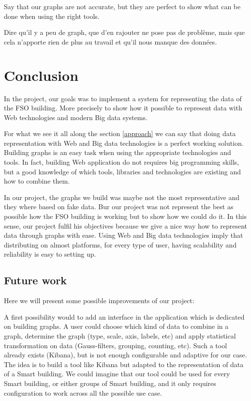 \documentclass{acm_proc_article-sp}
\begin{document}
Say that our graphs are not accurate, but they are perfect to show what can be done when using the right tools.

Dire qu'il y a peu de graph, que d'en rajouter ne pose pas de problème, mais que cela n'apporte rien de plus au travail et qu'il nous manque des données.
\section{Conclusion}
\label{conclusion}
In the project, our goals was to implement a system for representing the data of the FSO building. More precisely to show how it possible to represent data with Web technologies and modern Big data systems.

For what we see it all along the section \ref{approach} we can say that doing data representation with Web and Big data technologies is a perfect working solution. Building graphs is an easy task when using the appropriate technologies and tools. In fact, building Web application do not requires big programming skills, but a good knowledge of which tools, libraries and technologies are existing and how to combine them.

In our project, the graphs we build was maybe not the most representative and they where based on fake data. Bur our project was not represent the best as possible how the FSO building is working but to show how we could do it. In this sense, our project fulfil his objectives because we give a nice way how to represent data through graphs with ease. Using Web and Big data technologies imply that distributing on almost platforms, for every type of user, having scalability and reliability is easy to setting up.

\subsection{Future work}
\label{future_work}
Here we will present some possible improvements of our project:

A first possibility would to add an interface in the application which is dedicated on building graphs. A user could choose which kind of data to combine in a graph, determine the graph (type, scale, axis, labels, etc) and apply statistical transformation on data (Gauss-filters, grouping, counting, etc). Such a tool already exists (Kibana), but is not enough configurable and adaptive for our case. The idea is to build a tool like Kibana but adapted to the representation of data of a Smart building. We could imagine that our tool could be used for every Smart building, or either groups of Smart building, and it only requires configuration to work across all the possible use case.
\end{document}
